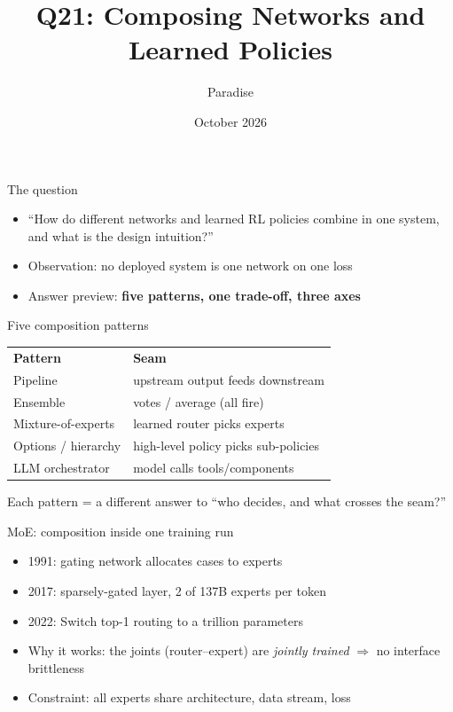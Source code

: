 \documentclass[aspectratio=169,11pt]{beamer}
\title{Q21: Composing Networks and Learned Policies}
\author{Paradise}
\date{October 2026}
\begin{document}
\frame{\titlepage}

\begin{frame}{The question}
\begin{itemize}
\item ``How do different networks and learned RL policies combine in one system, and what is the design intuition?''
\item Observation: no deployed system is one network on one loss
\item Answer preview: \textbf{five patterns, one trade-off, three axes}
\end{itemize}
\end{frame}

\begin{frame}{Five composition patterns}
\begin{table}
\begin{tabular}{ll}
\textbf{Pattern} & \textbf{Seam} \\
Pipeline & upstream output feeds downstream \\
Ensemble & votes / average (all fire) \\
Mixture-of-experts & learned router picks experts \\
Options / hierarchy & high-level policy picks sub-policies \\
LLM orchestrator & model calls tools/components \\
\end{tabular}
\end{table}

Each pattern = a different answer to ``who decides, and what crosses the seam?''
\end{frame}

\begin{frame}{MoE: composition inside one training run}
\begin{itemize}
\item 1991: gating network allocates cases to experts \cite{jacobs1991adaptive}
\item 2017: sparsely-gated layer, 2 of 137B experts per token \cite{shazeer2017sparsely}
\item 2022: Switch top-1 routing to a trillion parameters \cite{fedus2022switch}
\item Why it works: the joints (router--expert) are \emph{jointly trained} $\Rightarrow$ no interface brittleness
\item Constraint: all experts share architecture, data stream, loss
\end{itemize}
\end{frame}
\end{document}
